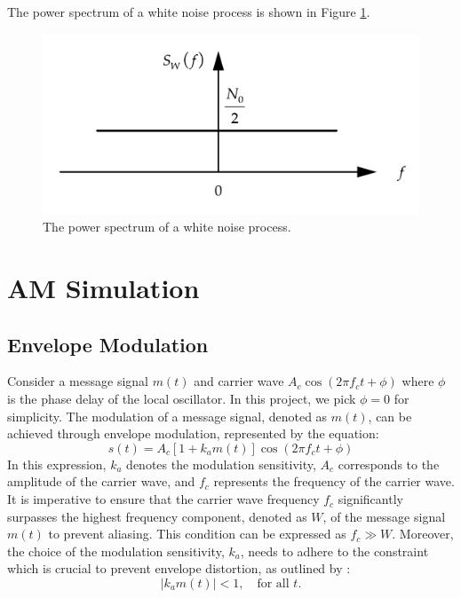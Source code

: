 \documentclass[../ECE459FinalProjectReport.tex]{subfiles}
\begin{document}
The power spectrum of a white noise process is shown in Figure \ref{fig:white-noise-spectrum}.
\begin{figure}[htb]
    \centering
    \includegraphics[scale=0.4]{plots/white-noise-power-spectrum.pdf}
    \caption{The power spectrum of a white noise process.}
    \label{fig:white-noise-spectrum}
\end{figure}


\section{AM Simulation}
\subsection{Envelope Modulation}
Consider a message signal $m(t)$ and carrier wave $A_c \cos(2\pi f_c t + \phi)$ where $\phi$ is the phase delay of the local oscillator. In this project, we pick $\phi = 0$ for simplicity. The modulation of a message signal, denoted as $m(t)$, can be achieved through envelope modulation, represented by the equation:
\begin{equation}
    s(t) = A_c [1 + k_a m(t)] \cos (2\pi f_c t + \phi)
\end{equation}
In this expression, $k_a$ denotes the modulation sensitivity, $A_c$ corresponds to the amplitude of the carrier wave, and $f_c$ represents the frequency of the carrier wave. It is imperative to ensure that the carrier wave frequency $f_c$ significantly surpasses the highest frequency component, denoted as $W$, of the message signal $m(t)$ to prevent aliasing. This condition can be expressed as $f_c \gg W$. Moreover, the choice of the modulation sensitivity, $k_a$, needs to adhere to the constraint which is crucial to prevent envelope distortion, as outlined by \textcite[pp. 101-102]{haykinIntroductionAnalogDigital2007}:
\begin{equation}
    \left| k_a m(t) \right| < 1, \quad \text{for all }t.
\end{equation}
\end{document}
